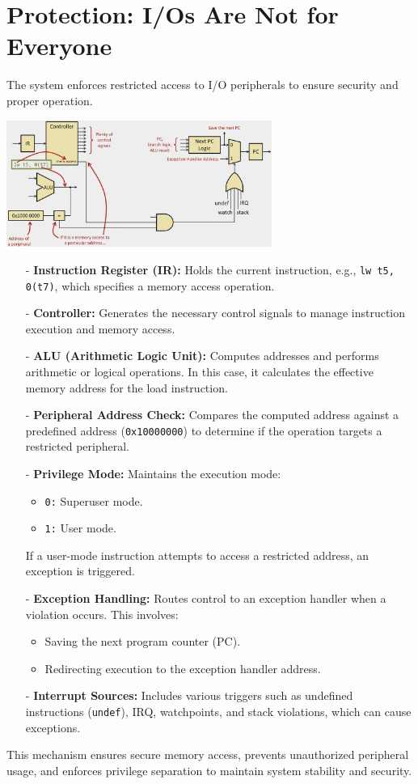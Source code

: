 \section{Protection: I/Os Are Not for Everyone}
The system enforces restricted access to I/O peripherals to ensure security and proper operation. 
\begin{center}
    \includegraphics[width=0.65\textwidth]{chapters/chapter2d/images/io_prot.png}
\end{center}
\begin{itemize}
    \item[-] \textbf{Instruction Register (IR):} Holds the current instruction, e.g., \texttt{lw t5, 0(t7)}, which specifies a memory access operation.
    \item[-] \textbf{Controller:} Generates the necessary control signals to manage instruction execution and memory access.
    \item[-] \textbf{ALU (Arithmetic Logic Unit):} Computes addresses and performs arithmetic or logical operations. In this case, it calculates the effective memory address for the load instruction.
    \item[-] \textbf{Peripheral Address Check:} Compares the computed address against a predefined address (\texttt{0x10000000}) to determine if the operation targets a restricted peripheral.
    \item[-] \textbf{Privilege Mode:} Maintains the execution mode:
        \begin{itemize}
            \item \texttt{0:} Superuser mode.
            \item \texttt{1:} User mode.
        \end{itemize}
        If a user-mode instruction attempts to access a restricted address, an exception is triggered.
    \item[-] \textbf{Exception Handling:} Routes control to an exception handler when a violation occurs. This involves:
        \begin{itemize}
            \item Saving the next program counter (PC).
            \item Redirecting execution to the exception handler address.
        \end{itemize}
    \item[-] \textbf{Interrupt Sources:} Includes various triggers such as undefined instructions (\texttt{undef}), IRQ, watchpoints, and stack violations, which can cause exceptions.
\end{itemize}

\noindent This mechanism ensures secure memory access, prevents unauthorized peripheral usage, and enforces privilege separation to maintain system stability and security.
